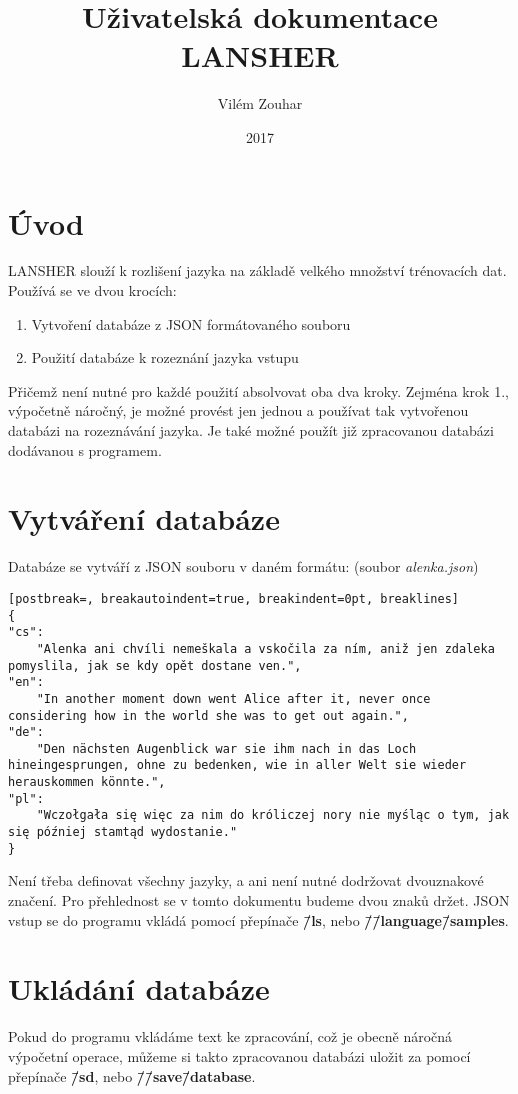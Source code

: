 \documentclass[11pt]{article}
\title{\textbf{Uživatelská dokumentace LANSHER }}
\author{Vilém Zouhar}
\date{2017}
\begin{document}
\maketitle

\section{Úvod} 
LANSHER slouží k rozlišení jazyka na základě velkého množství trénovacích dat. Používá se ve dvou krocích:

\begin{enumerate}
\item Vytvoření databáze z JSON formátovaného souboru
\item Použití databáze k rozeznání jazyka vstupu
\end{enumerate}

Přičemž není nutné pro každé použití absolvovat oba dva kroky. Zejména krok 1., výpočetně náročný, je možné provést jen jednou a používat tak vytvořenou databázi na rozeznávání jazyka. Je také možné použít již zpracovanou databázi dodávanou s programem.

\section{Vytváření databáze}
Databáze se vytváří z JSON souboru v daném formátu: (soubor \textit{alenka.json})
\begin{lstlisting}[postbreak=, breakautoindent=true, breakindent=0pt, breaklines]
{
"cs":
	"Alenka ani chvíli nemeškala a vskočila za ním, aniž jen zdaleka pomyslila, jak se kdy opět dostane ven.",
"en": 
	"In another moment down went Alice after it, never once considering how in the world she was to get out again.",
"de":
	"Den nächsten Augenblick war sie ihm nach in das Loch hineingesprungen, ohne zu bedenken, wie in aller Welt sie wieder herauskommen könnte.",
"pl":
	"Wczołgała się więc za nim do króliczej nory nie myśląc o tym, jak się później stamtąd wydostanie."
}
\end{lstlisting}

Není třeba definovat všechny jazyky, a ani není nutné dodržovat dvouznakové značení. Pro přehlednost se v tomto dokumentu budeme dvou znaků držet. JSON vstup se do programu vkládá pomocí přepínače \textbf{\=/ls}, nebo \textbf{\=/\=/language\=/samples}.

\section{Ukládání databáze}
Pokud do programu vkládáme text ke zpracování, což je obecně náročná výpočetní operace, můžeme si takto zpracovanou databázi uložit za pomocí přepínače \textbf{\=/sd}, nebo \textbf{\=/\=/save\=/database}.
\end{document}
